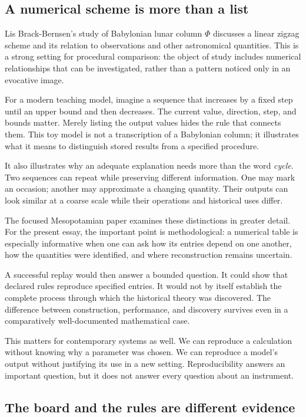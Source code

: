 \documentclass[11pt]{article}
\begin{document}
\subsection{A numerical scheme is more than a list}

Lis Brack-Bernsen's study of Babylonian lunar column $\Phi$ discusses a
linear zigzag scheme and its relation to observations and other astronomical
quantities.\cite{brack} This is a strong setting for procedural comparison:
the object of study includes numerical relationships that can be investigated,
rather than a pattern noticed only in an evocative image.

For a modern teaching model, imagine a sequence that increases by a fixed
step until an upper bound and then decreases. The current value, direction,
step, and bounds matter. Merely listing the output values hides the rule
that connects them. This toy model is not a transcription of a Babylonian
column; it illustrates what it means to distinguish stored results from a
specified procedure.

It also illustrates why an adequate explanation needs more than the word
\emph{cycle}. Two sequences can repeat while preserving different information.
One may mark an occasion; another may approximate a changing quantity.
Their outputs can look similar at a coarse scale while their operations and
historical uses differ.

The focused Mesopotamian paper examines these distinctions in greater
detail.\cite{mesopotamia} For the present essay, the important point is
methodological: a numerical table is especially informative when one can
ask how its entries depend on one another, how the quantities were identified,
and where reconstruction remains uncertain.

A successful replay would then answer a bounded question. It could show that
declared rules reproduce specified entries. It would not by itself establish
the complete process through which the historical theory was discovered.
The difference between construction, performance, and discovery survives
even in a comparatively well-documented mathematical case.

This matters for contemporary systems as well. We can reproduce a calculation
without knowing why a parameter was chosen. We can reproduce a model's output
without justifying its use in a new setting. Reproducibility answers an important
question, but it does not answer every question about an instrument.

\subsection{The board and the rules are different evidence}
\end{document}
